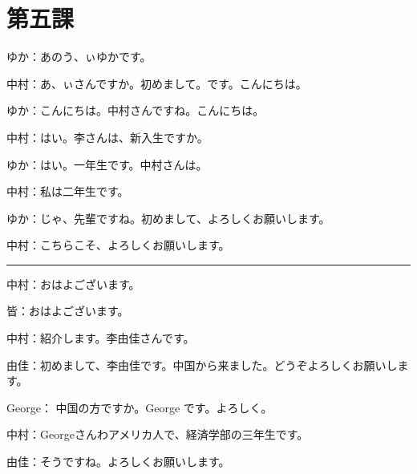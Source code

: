 

\section{第五課 }

ゆか：あのう、ぃゆかです。

中村：あ、ぃさんですか。初めまして。です。こんにちは。

ゆか：こんにちは。中村さんですね。こんにちは。

中村：はい。李さんは、新入生ですか。

ゆか：はい。一年生です。中村さんは。

中村：私は二年生です。

ゆか：じゃ、先輩ですね。初めまして、よろしくお願いします。

中村：こちらこそ、よろしくお願いします。

\rule{5cm}{1pt}

中村：おはよございます。

皆：おはよございます。

中村：紹介します。李由佳さんです。

由佳：初めまして、李由佳です。中国から来ました。どうぞよろしくお願いします。

George： 中国の方ですか。George です。よろしく。

中村：Georgeさんわアメリカ人で、経済学部の三年生です。

由佳：そうですね。よろしくお願いします。

